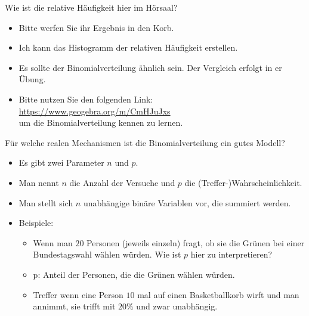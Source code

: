 \documentclass[usenames,dvipsnames,handout]{beamer}
\begin{document}
\begin{frame}{Wie ist die relative Häufigkeit hier im Hörsaal?}
\begin{itemize}
\item{Bitte werfen Sie ihr Ergebnis in den Korb.}
\item{Ich kann das Histogramm der relativen Häufigkeit erstellen.}
\item{Es sollte der Binomialverteilung ähnlich sein. Der Vergleich erfolgt in er Übung.}
\item{Bitte nutzen Sie den folgenden Link: \url{https://www.geogebra.org/m/CmHJuJxs}\\
um die Binomialverteilung kennen zu lernen.}
\end{itemize}
\end{frame}

\begin{frame}{Für welche realen Mechanismen ist die Binomialverteilung ein gutes Modell?}
\begin{itemize}
\item{Es gibt zwei Parameter $n$ und $p.$}\pause
\item{Man nennt $n$ die Anzahl der Versuche und $p$ die (Treffer-)Wahrscheinlichkeit.}\pause
\item{Man stellt sich $n$ unabhängige binäre Variablen vor, die summiert werden.}\pause
\item{Beispiele:
\begin{itemize}
\item{Wenn man $20$ Personen (jeweils einzeln) fragt, ob sie die Grünen bei einer Bundestagswahl wählen würden.
Wie ist $p$ hier zu interpretieren?}\pause
\item{p: Anteil der Personen, die die Grünen wählen würden.}
\item{Treffer wenn eine Person $10$ mal auf einen Basketballkorb wirft und man annimmt,
sie trifft mit $20\%$ und zwar unabhängig.}\pause
\end{itemize}
}
\end{itemize}
\end{frame}
\end{document}
